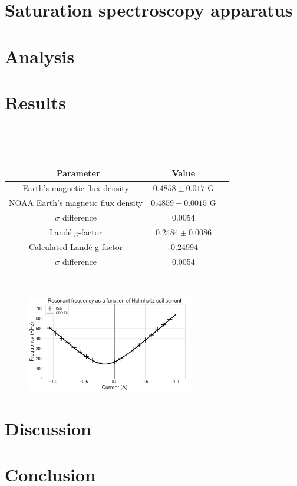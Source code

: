 \documentclass{article}
\begin{document}
\section{Saturation spectroscopy apparatus}

\section{Analysis}

\section{Results}
\begin{table}[h]
	\centering
	\ {\def\arraystretch{1.2}\tabcolsep=20pt\
\begin{tabular}{ccc}
	\hline\ Parameter & Value \\ 
	\hline
	Earth's magnetic flux density & $0.4858 \pm 0.017$ G \\ 
	NOAA Earth's magnetic flux density & $0.4859 \pm 0.0015$ G \\ 
	$\sigma$ difference & 0.0054 \\
	\hline
	Landé g-factor & $0.2484 \pm 0.0086$ & \\
	Calculated Landé g-factor & $~0.24994$ & \\
	$\sigma$ difference & 0.0054 \\
	\hline
\end{tabular}%
\ }
\end{table}%

\begin{figure}[h!]
\begin{center}
\includegraphics[width=0.65\textwidth]{figure1}
\caption{}
\end{center}%
\end{figure}%


\section{Discussion}

\section{Conclusion}
\end{document}
